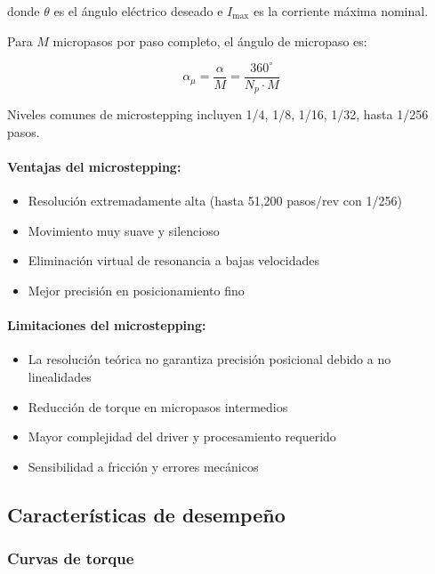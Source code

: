 donde $\theta$ es el ángulo eléctrico deseado e $I_{\max}$ es la corriente máxima nominal.

Para $M$ micropasos por paso completo, el ángulo de micropaso es:

\begin{equation}
\alpha_{\mu} = \frac{\alpha}{M} = \frac{360^\circ}{N_p \cdot M}
\end{equation}

Niveles comunes de microstepping incluyen 1/4, 1/8, 1/16, 1/32, hasta 1/256 pasos.

\paragraph{Ventajas del microstepping:}

\begin{itemize}
    \item Resolución extremadamente alta (hasta 51,200 pasos/rev con 1/256)
    \item Movimiento muy suave y silencioso
    \item Eliminación virtual de resonancia a bajas velocidades
    \item Mejor precisión en posicionamiento fino
\end{itemize}

\paragraph{Limitaciones del microstepping:}

\begin{itemize}
    \item La resolución teórica no garantiza precisión posicional debido a no linealidades
    \item Reducción de torque en micropasos intermedios
    \item Mayor complejidad del driver y procesamiento requerido
    \item Sensibilidad a fricción y errores mecánicos
\end{itemize}

\subsection{Características de desempeño}

\subsubsection{Curvas de torque}

